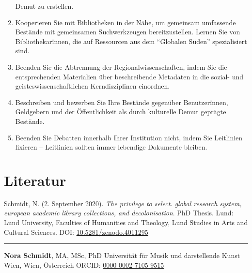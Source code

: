 \documentclass[a4paper,
fontsize=11pt,
oneside,
numbers=noperiodatend,
parskip=half-,
bibliography=totoc,
final
]{scrartcl}
\begin{document}
\begin{enumerate}
  Demut zu erstellen.
\item
  Kooperieren Sie mit Bibliotheken in der Nähe, um gemeinsam umfassende
  Bestände mit gemeinsamen Suchwerkzeugen bereitzustellen. Lernen Sie
  von Bibliothekarïnnen, die auf Ressourcen aus dem \enquote{Globalen
  Süden} spezialisiert sind.
\item
  Beenden Sie die Abtrennung der Regionalwissenschaften, indem Sie die
  entsprechenden Materialien über beschreibende Metadaten in die sozial-
  und geisteswissenschaftlichen Kerndisziplinen einordnen.
\item
  Beschreiben und bewerben Sie Ihre Bestände gegenüber Benutzerïnnen,
  Geldgebern und der Öffentlichkeit als durch kulturelle Demut geprägte
  Bestände.
\item
  Beenden Sie Debatten innerhalb Ihrer Institution nicht, indem Sie
  Leitlinien fixieren -- Leitlinien sollten immer lebendige Dokumente
  bleiben.
\end{enumerate}

\section{Literatur}

Schmidt, N. (2. September 2020). \textit{The privilege to select. global research system, european academic library collections, and decolonisation}. PhD Thesis. Lund: Lund University, Faculties of Humanities and Theology, Lund Studies in Arts and Cultural Sciences. DOI: \href{https://doi.org/10.5281/zenodo.4011295}{10.5281/zenodo.4011295}

\begin{center}\rule{0.5\linewidth}{0.5pt}\end{center}

\textbf{Nora Schmidt}, MA, MSc, PhD \textbar{} Universität für Musik
und darstellende Kunst Wien, Wien, Österreich \textbar ORCID:
\href{https://orcid.org/0000-0002-7105-9515}{0000-0002-7105-9515}
\end{document}
